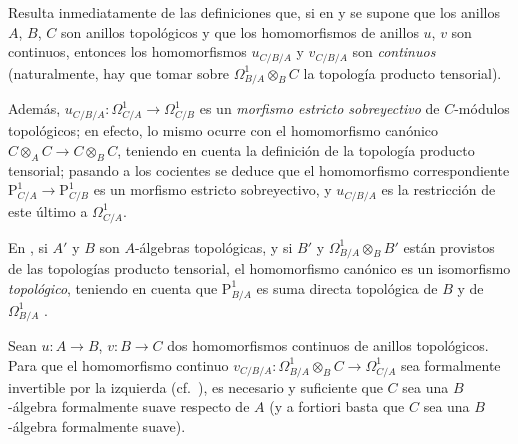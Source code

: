 \begin{env}[20.7.1]
\label{0.20.7.1-fr}
Resulta inmediatamente de las definiciones que, si en  y
 se supone que los anillos $A$, $B$, $C$ son anillos
topológicos y que los homomorfismos de anillos $u$, $v$ son continuos, entonces los
homomorfismos $u_{C/B/A}$ y $v_{C/B/A}$ son \emph{continuos} (naturalmente,
hay que tomar sobre $\Omega^1_{B/A}\otimes_B C$ la topología producto
tensorial).

Además, $u_{C/B/A}:\Omega^1_{C/A}\to\Omega^1_{C/B}$ es un
\emph{morfismo estricto sobreyectivo} de $C$-módulos topológicos; en efecto, lo
mismo ocurre con el homomorfismo canónico $C\otimes_A C\to C\otimes_B C$, teniendo
en cuenta la definición de la topología producto tensorial; pasando a los
cocientes se deduce que el homomorfismo correspondiente
$\mathrm{P}^1_{C/A}\to\mathrm{P}^1_{C/B}$ es un morfismo estricto sobreyectivo,
y $u_{C/B/A}$ es la restricción de este último a $\Omega^1_{C/A}$.

En , si $A'$ y $B$ son $A$-álgebras topológicas,
y si $B'$ y $\Omega^1_{B/A}\otimes_B B'$ están provistos de las topologías producto
tensorial, el homomorfismo canónico  es un isomorfismo
\emph{topológico}, teniendo en cuenta que $\mathrm{P}^1_{B/A}$ es suma directa
topológica de $B$ y de $\Omega^1_{B/A}$ .
\end{env}

\begin{proposition}[20.7.2]
\label{0.20.7.2-fr}
Sean $u:A\to B$, $v:B\to C$ dos homomorfismos continuos de anillos
topológicos. Para que el homomorfismo continuo
$v_{C/B/A}:\Omega^1_{B/A}\otimes_B C\to\Omega^1_{C/A}$ sea formalmente
invertible por la izquierda \textup{(cf.\ )}, es necesario y suficiente que $C$
sea una $B$-álgebra formalmente suave respecto de $A$
\textup{} \textup{(y} a fortiori \textup{basta que $C$ sea una
$B$-álgebra formalmente suave)}.
\end{proposition}

